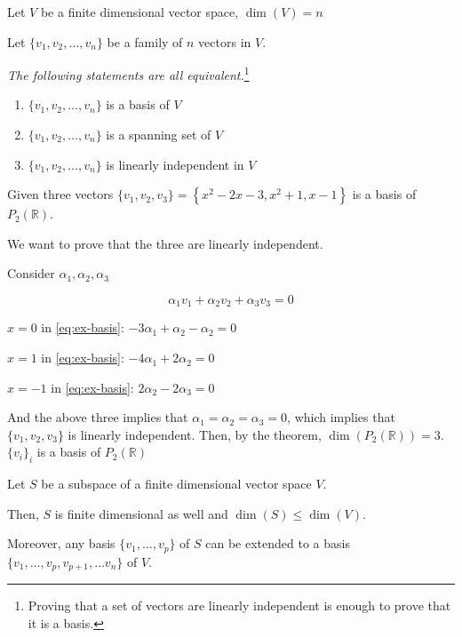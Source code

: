 \begin{theorem}
	Let $V$ be a finite dimensional vector space, $\dim(V)=n$

	Let $\{v_1, v_2, \ldots, v_n\}$ be a family of $n$ vectors in $V$.

	\textit{The following statements are all equivalent.}\footnote{Proving that a set of vectors are linearly independent is enough to prove that it is a basis.}

	\begin{enumerate}
		\item $\{v_1, v_2, \ldots, v_n\}$ is a basis of $V$
		\item $\{v_1, v_2, \ldots, v_n\}$ is a spanning set of $V$
		\item $\{v_1, v_2, \ldots, v_n\}$ is linearly independent in $V$
	\end{enumerate}
\end{theorem}

\begin{example}
	Given three vectors $\{v_1, v_2, v_3\} =  \left\{x^2-2x-3, x^2+1,x-1\right\}$ is a basis of $P_2(\mathbb{R})$.

	We want to prove that the three are linearly independent.

	Consider $\alpha_1, \alpha_2, \alpha_3$

	\begin{equation} \label{eq:ex-basis}
		\alpha_1v_1 + \alpha_2v_2 + \alpha_3v_3 = 0
	\end{equation}

	$x = 0$ in \cref*{eq:ex-basis}: $-3\alpha_1+\alpha_2-\alpha_2=0$

	$x = 1$ in \cref*{eq:ex-basis}: $-4\alpha_1+2\alpha_2 = 0$

	$x = -1$ in \cref*{eq:ex-basis}: $2\alpha_2 - 2\alpha_3 = 0$

	And the above three implies that $\alpha_1=\alpha_2=\alpha_3=0$, which implies that $\{v_1, v_2, v_3\}$ is linearly independent. Then, by the theorem, $\dim(P_2(\mathbb{R})) = 3$. $\{v_i\}_i$ is a basis of $P_2(\mathbb{R})$
\end{example}

\begin{theorem}
	Let $S$ be a subspace of a finite dimensional vector space $V$.

	Then, $S$ is finite dimensional as well and $\dim(S)\leq \dim(V)$.

	Moreover, any basis $\{v_1, \ldots, v_p\}$ of $S$ can be extended to a basis $\{v_1, \ldots, v_p, v_{p+1}, \ldots v_n\}$ of $V$.
\end{theorem}

